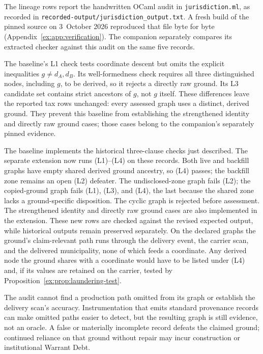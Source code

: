 \documentclass[11pt]{article}
\theoremstyle{definition}
\newcommand{\code}[1]{\texttt{#1}}
\begin{document}
The lineage rows report the handwritten OCaml audit in \code{jurisdiction.ml}, as recorded in \nolinkurl{recorded-output/jurisdiction_output.txt}. A fresh build of the pinned source on 3~October 2026 reproduced that file byte for byte (Appendix~\ref{ex:app:verification}). The companion separately compares its extracted checker against this audit on the same five records.

The baseline's L1 check tests coordinate descent but omits the explicit inequalities $g\neq d_A,d_B$. Its well-formedness check requires all three distinguished nodes, including $g$, to be derived, so it rejects a directly raw ground. Its L3 candidate set contains strict ancestors of $g$, not $g$ itself. These differences leave the reported tax rows unchanged: every assessed graph uses a distinct, derived ground. They prevent this baseline from establishing the strengthened identity and directly raw ground cases; those cases belong to the companion's separately pinned evidence.

The baseline implements the historical three-clause checks just described. The separate extension now runs (L1)--(L4) on these records. Both live and backfill graphs have empty shared derived ground ancestry, so (L4) passes; the backfill zone remains an open (L2) defeater. The undisclosed-zone graph fails (L2); the copied-ground graph fails (L1), (L3), and (L4), the last because the shared zone lacks a ground-specific disposition. The cyclic graph is rejected before assessment. The strengthened identity and directly raw ground cases are also implemented in the extension. These new rows are checked against the revised expected output, while historical outputs remain preserved separately. On the declared graphs the ground's claim-relevant path runs through the delivery event, the carrier scan, and the delivered municipality, none of which feeds a coordinate. Any derived node the ground shares with a coordinate would have to be listed under (L4) and, if its values are retained on the carrier, tested by Proposition~\ref{ex:prop:laundering-test}.

The audit cannot find a production path omitted from its graph or establish the delivery scan's accuracy. Instrumentation that emits standard provenance records can make omitted paths easier to detect, but the resulting graph is still evidence, not an oracle. A false or materially incomplete record defeats the claimed ground; continued reliance on that ground without repair may incur construction or institutional Warrant Debt.
\end{document}
